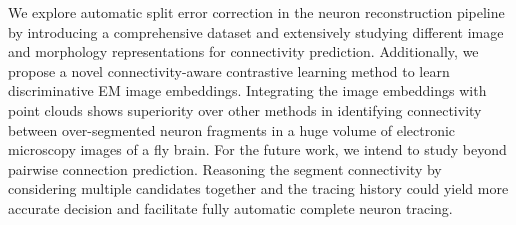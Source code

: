 We explore automatic split error correction in the neuron reconstruction pipeline by introducing a comprehensive dataset and extensively studying different image and morphology representations for connectivity prediction. Additionally, we propose a novel connectivity-aware contrastive learning method to learn discriminative EM image embeddings. Integrating the image embeddings with point clouds shows superiority over other methods in identifying connectivity between over-segmented neuron fragments in a huge volume of electronic microscopy images of a fly brain. For the future work, we intend to study beyond pairwise connection prediction. Reasoning the segment connectivity by considering multiple candidates together and the tracing history could yield more accurate decision and facilitate fully automatic complete neuron tracing.
 